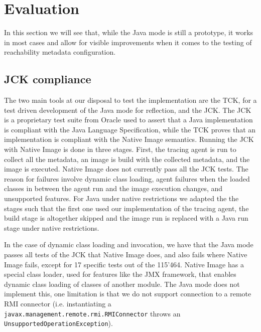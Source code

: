 

\chapter{Evaluation}
In this section we will see that, while the Java mode is still a prototype, it works in most cases and allow for visible improvements when it comes to the testing of reachability metadata configuration.

\section{JCK compliance}
The two main tools at our disposal to test the implementation are the TCK, for a test driven development of the Java mode for reflection, and the JCK.
The JCK is a proprietary test suite from Oracle used to assert that a Java implementation is compliant with the Java Language Specification, while the TCK proves that an implementation is compliant with
the Native Image semantics.
Running the JCK with Native Image is done in three stages. First, the tracing agent is run to collect all the metadata, an image is build with the collected metadata, and the image is executed. 
Native Image does not currently pass all the JCK tests. The reason for failures involve dynamic class loading, agent failures when the loaded classes in between the agent run and the image execution changes, and unsupported features.
For Java under native restrictions we adapted the the stages such that the first one used our implementation of the tracing agent, the build stage is altogether skipped and the image run is replaced with a Java run stage under native restrictions.

In the case of dynamic class loading and invocation, we have that the Java mode passes all tests of the JCK that Native Image does, and also fails where Native Image fails, except for 17 specific tests out of the 115'464.
Native Image has a special class loader, used for features like the JMX framework, that enables dynamic class loading of classes of another module. The Java mode does not implement this, one limitation is that we do not support connection to a remote RMI connector (i.e. instantiating a \verb|javax.management.remote.rmi.RMIConnector| throws an \verb|UnsupportedOperationException|).

